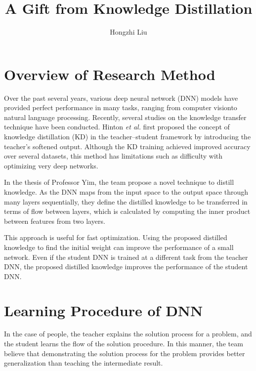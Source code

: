 \documentclass[twocolumn]{article}
\author{Hongzhi Liu}
\title{A Gift from Knowledge Distillation}
\begin{document}
	\maketitle
	\par
	\section{Overview of Research Method}
	Over the past several years, various deep neural network (DNN) models have provided perfect performance in many tasks, ranging from computer visionto natural language processing. Recently, several studies on the knowledge transfer technique have been conducted. Hinton \emph{et al.} \cite{Hinton2015Distilling} first proposed the concept of knowledge distillation (KD) in the teacher–student framework by introducing the teacher’s softened output. Although the KD training achieved improved accuracy over several datasets, this method has limitations such as difficulty with optimizing very deep networks.
	 
	In the thesis of Professor Yim, the team propose a novel technique to distill knowledge\cite{Yim2017A}. As the DNN maps from the input space to the output space through many layers sequentially, they define the distilled knowledge to be transferred in terms of flow between layers, which is calculated by computing the inner product between features from two layers. 
	
	This approach is useful for fast optimization. Using the proposed distilled knowledge to find the initial weight can improve the performance of a small network. Even if the student DNN is trained at a different task from the teacher DNN, the proposed distilled knowledge improves the performance of the student DNN.
	\section{Learning Procedure of DNN}	
    In the case of people, the teacher explains the solution process for a problem, and the student learns the flow of the solution procedure. In this manner, the team believe that demonstrating the solution process for the problem provides better generalization than teaching the intermediate result. 
    
\end{document}
